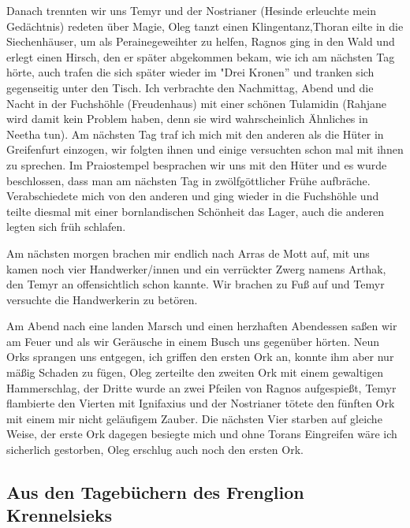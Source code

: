 Danach trennten wir uns Temyr und der Nostrianer (Hesinde erleuchte mein Gedächtnis) redeten über Magie, Oleg tanzt einen Klingentanz,Thoran eilte in die Siechenhäuser, um als Perainegeweihter zu helfen, Ragnos ging in den Wald und erlegt einen Hirsch, den er später abgekommen bekam, wie ich am nächsten Tag hörte, auch trafen die sich später wieder im "Drei Kronen'' und tranken sich gegenseitig unter den Tisch. Ich verbrachte den Nachmittag, Abend und die Nacht in der Fuchshöhle (Freudenhaus) mit einer schönen Tulamidin (Rahjane wird damit kein Problem haben, denn sie wird wahrscheinlich Ähnliches in Neetha tun). Am nächsten Tag traf ich mich mit den anderen als die Hüter in Greifenfurt einzogen, wir folgten ihnen und einige versuchten schon mal mit ihnen zu sprechen. Im Praiostempel besprachen wir uns mit den Hüter und es wurde beschlossen, dass man am nächsten Tag in zwölfgöttlicher Frühe aufbräche. Verabschiedete mich von den anderen und ging wieder in die Fuchshöhle und teilte diesmal mit einer bornlandischen Schönheit das Lager, auch die anderen legten sich früh schlafen.\par
Am nächsten morgen brachen mir endlich nach Arras de Mott auf, mit uns kamen noch vier Handwerker/innen und ein verrückter Zwerg namens Arthak, den Temyr an offensichtlich schon kannte. Wir brachen zu Fuß auf und Temyr versuchte die Handwerkerin zu betören.\par
Am Abend nach eine landen Marsch und einen herzhaften Abendessen saßen wir am Feuer und als wir Geräusche in einem Busch uns gegenüber hörten. Neun Orks sprangen uns entgegen, ich griffen den ersten Ork an, konnte ihm aber nur mäßig Schaden zu fügen, Oleg zerteilte den zweiten Ork mit einem gewaltigen Hammerschlag, der Dritte wurde an zwei Pfeilen von Ragnos aufgespießt, Temyr flambierte den Vierten mit Ignifaxius und der Nostrianer tötete den fünften Ork mit einem mir nicht geläufigem Zauber. Die nächsten Vier starben auf gleiche Weise, der erste Ork dagegen besiegte mich und ohne Torans Eingreifen wäre ich sicherlich gestorben, Oleg erschlug auch noch den ersten Ork.\par

\subsection{Aus den Tagebüchern des Frenglion Krennelsieks}

